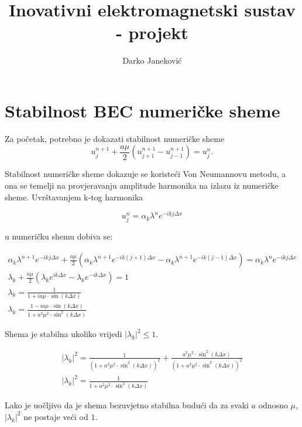 \documentclass{article}
\title{Inovativni elektromagnetski sustav - projekt}
\author{Darko Janeković}
\begin{document}
\maketitle

\section{Stabilnost BEC numeričke sheme}

Za početak, potrebno je dokazati stabilnost numeričke sheme
\begin{equation}
    u_j^{n+1} + \frac{a \mu}{2}(u_{j+1}^{n+1} - u_{j-1}^{n+1}) = u_j^n.
\end{equation}

Stabilnost numeričke sheme dokazuje se koristeći Von Neumannovu metodu, a ona
se temelji na provjeravanju amplitude harmonika na izlazu iz numeričke sheme.
Uvrštavanjem k-tog harmonika

\begin{equation}
    u_j^n = \alpha_k \lambda^n e^{-i k j \Delta x}
\end{equation}

u numeričku shemu dobiva se:

\begin{gather}
    \alpha_k \lambda^{n+1} e^{-i k j \Delta x} + \frac{a \mu}{2}(
        \alpha_k \lambda^{n+1} e^{-i k (j + 1) \Delta x} -
        \alpha_k \lambda^{n+1} e^{-i k (j - 1) \Delta x}
    ) = \alpha_k \lambda^n e^{-i k j \Delta x} \nonumber \\
    \lambda_k + \frac{a \mu}{2}(
        \lambda_k e^{i k \Delta x} -
        \lambda_k e^{-i k  \Delta x}) = 1 \nonumber \\
    \lambda_k = \frac{1}{1 + i a \mu \cdot \sin(k \Delta x)} \nonumber \\
    \lambda_k = \frac{1 - i a \mu \cdot \sin(k \Delta x)}
        {1 + a^2 \mu^2 \cdot \sin^2(k \Delta x)}
\end{gather}

Shema je stabilna ukoliko vrijedi $|\lambda_k|^2 \le 1$.

\begin{gather}
    |\lambda_k|^2 = \frac{1}{(1 + a^2 \mu^2 \cdot \sin^2(k \Delta x))^2} +
        \frac{a^2 \mu^2 \cdot \sin^2(k \Delta x)}
            {(1 + a^2 \mu^2 \cdot \sin^2(k \Delta x))^2} \\
    |\lambda_k|^2 = \frac{1}{1 + a^2 \mu^2 \cdot \sin^2(k \Delta x)}
\end{gather}

Lako je uočljivo da je shema bezuvjetno stabilna budući da za svaki $a$ odnosno
$\mu$, $|\lambda_k|^2$ ne postaje veći od $1$.
\end{document}
